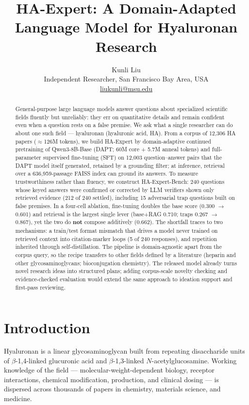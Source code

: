 \documentclass[11pt]{article}
\title{HA-Expert: A Domain-Adapted Language Model
for Hyaluronan Research}
\author{Kunli Liu\\
Independent Researcher, San Francisco Bay Area, USA\\
\href{mailto:liukunli@msu.edu}{liukunli@msu.edu}}
\date{}
\begin{document}
\maketitle


\begin{abstract}
General-purpose large language models answer questions about
specialized scientific fields fluently but unreliably: they err
on quantitative details and remain confident even when a question rests
on a false premise. We ask what a single researcher
can do about one such field ---
hyaluronan (hyaluronic acid, HA). From a corpus of 12,306 HA papers
($\approx$126M tokens), we build HA-Expert by domain-adaptive
continued pretraining of Qwen3-8B-Base (DAPT; 60M core + 5.7M anneal tokens) and
full-parameter supervised fine-tuning (SFT) on 12,003
question--answer pairs that the DAPT model itself generated, retained
by a grounding filter; at inference, retrieval over a 636,959-passage FAISS
index can ground its answers. To measure trustworthiness rather than
fluency, we construct HA-Expert-Bench: 240 questions whose keyed
answers were confirmed or corrected by LLM verifiers shown only
retrieved evidence (212 of 240 settled), including 15 adversarial
trap questions built on false premises. In a four-cell ablation,
fine-tuning doubles the base score (0.300 $\rightarrow$ 0.601) and
retrieval is the largest single lever (base+RAG 0.710; traps 0.267
$\rightarrow$ 0.867), yet the two do \textbf{not} compose additively
(0.662). The shortfall traces to two mechanisms: a train/test format
mismatch that drives a model never trained on retrieved context
into citation-marker loops (5 of 240 responses), and repetition
inherited through self-distillation. The pipeline is domain-agnostic
apart from the corpus query, so the recipe transfers to other fields
defined by a literature (heparin and other glycosaminoglycans;
bioconjugation chemistry). The released model already turns novel
research ideas into structured plans; adding corpus-scale novelty
checking and evidence-checked evaluation would extend the same
approach to ideation support and first-pass reviewing.
\end{abstract}

\section{Introduction}
\label{sec:intro}

Hyaluronan is a linear glycosaminoglycan built from repeating
disaccharide units of $\beta$-1,4-linked glucuronic acid and
$\beta$-1,3-linked $N$-acetylglucosamine. Working knowledge of the
field --- molecular-weight-dependent biology, receptor interactions,
chemical modification, production, and clinical dosing --- is dispersed
across thousands of papers in chemistry, materials science, and
medicine.
\end{document}
